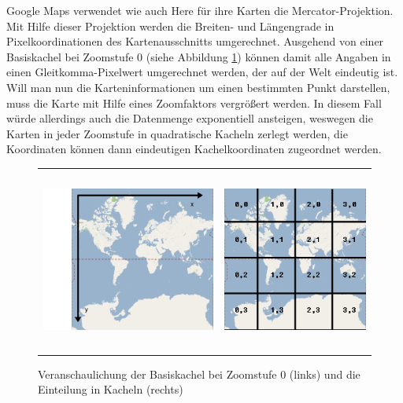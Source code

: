 Google Maps verwendet wie auch Here für ihre Karten die Mercator-Projektion. Mit Hilfe dieser Projektion werden die Breiten- und Längengrade in Pixelkoordinationen des Kartenausschnitts umgerechnet. Ausgehend von einer Basiskachel bei Zoomstufe 0 (siehe Abbildung \ref{fig:pixelcoordinates}) können damit alle Angaben in einen Gleitkomma-Pixelwert umgerechnet werden, der auf der Welt eindeutig ist. Will man nun die Karteninformationen um einen bestimmten Punkt darstellen, muss die Karte mit Hilfe eines Zoomfaktors vergrößert werden. In diesem Fall würde allerdings auch die Datenmenge exponentiell ansteigen, weswegen die Karten in jeder Zoomstufe in quadratische Kacheln zerlegt werden, die Koordinaten können dann eindeutigen Kachelkoordinaten zugeordnet werden.\\
\begin{figure}
\centering
\begin{tabular}{@{}cc@{}}
    \includegraphics[height=6cm]{images/pixelCoordinates.png} &
    \includegraphics[height=6cm]{images/tileCoordinates.png} \\
\end{tabular}
\caption{Veranschaulichung der Basiskachel bei Zoomstufe 0 (links) und die Einteilung in Kacheln (rechts)}
\label{fig:pixelcoordinates}
\end{figure}


